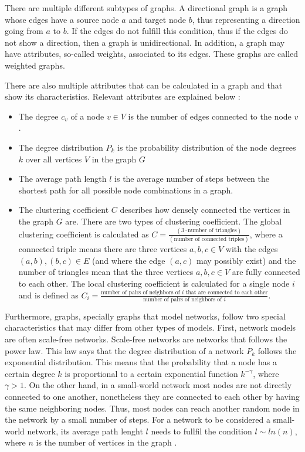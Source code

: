 There are multiple different subtypes of graphs. A directional graph is a graph 
whose edges have a source node $a$ and target node $b$, thus representing
a direction going from $a$ to $b$. If the edges do not fulfill this 
condition, thus if the edges do not show a direction, then a graph is unidirectional.
In addition, a graph may have attributes, so-called weights, associated to its edges.
These graphs are called weighted graphs.

There are also multiple attributes that can be calculated in a graph
and that show its characteristics. Relevant attributes are 
explained below \cite{basicnetwork}:
\begin{itemize}
    \item The degree $c_v$ of a node $v \in V$ is the number of edges connected to the
    node $v$. 
    \item The degree distribution $P_k$ is the probability distribution 
    of the node degrees $k$ over all vertices $V$ in the graph $G$
    \item The average path length $l$ is the average number of steps between
    the shortest path for all possible node combinations in a graph.
    \item The clustering coefficient $C$ describes how densely connected
    the vertices in the graph $G$ are. There are two types of
    clustering coefficient. The global clustering
    coefficient is calculated as 
    $C=\frac{(3 \cdot\text{number of triangles})}{(\text{number of connected triples})}$,
    where a connected triple means there are three vertices $a,b,c\in V$ with
    the edges $(a,b), (b,c) \in E$ (and where the edge $(a,c)$ may 
    possibly exist) and the number of triangles mean
    that the three vertices $a,b,c\in V$ are fully connected to each other.
    The local clustering coefficient is calculated for a single node $i$
    and is defined as $C_i=\frac{\text{number of pairs of neighbors of }i 
    \text{ that are connected to each other}}
    {\text{number of pairs of neighbors of }i }$.
\end{itemize}

Furthermore, graphs, specially graphs that model networks, follow two special 
characteristics that may differ from other types of models.
First, network models are often scale-free networks.
Scale-free networks are networks that follows the power law.
This law says that the degree distribution of a network
$P_k$ follows the exponential distribution.
This means that the probability that a node has a certain degree $k$ 
is proportional to a certain exponential function $k^{-\gamma}$, where
$\gamma>1$.
On the other hand, in a small-world network most nodes are not directly
connected to one another, nonetheless they are connected to each other by
having the same neighboring nodes. Thus, most nodes can reach another
random node in the network by a small number of steps. For a network
to be considered a small-world network, its average path lenght $l$ 
needs to fullfil the condition $l\sim ln(n)$, where $n$ is the number
of vertices in the graph \cite{wattsmodel}.

